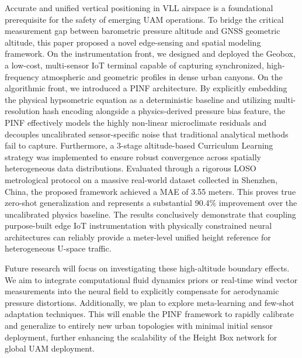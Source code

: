 \documentclass[lettersize,journal]{IEEEtran}
\begin{document}
Accurate and unified vertical positioning in VLL airspace is a foundational prerequisite for the safety of emerging UAM operations. To bridge the critical measurement gap between barometric pressure altitude and GNSS geometric altitude, this paper proposed a novel edge-sensing and spatial modeling framework.
On the instrumentation front, we designed and deployed the Geobox, a low-cost, multi-sensor IoT terminal capable of capturing synchronized, high-frequency atmospheric and geometric profiles in dense urban canyons. On the algorithmic front, we introduced a PINF architecture. By explicitly embedding the physical hypsometric equation as a deterministic baseline and utilizing multi-resolution hash encoding alongside a physics-derived pressure bias feature, the PINF effectively models the highly non-linear microclimate residuals and decouples uncalibrated sensor-specific noise that traditional analytical methods fail to capture. Furthermore, a 3-stage altitude-based Curriculum Learning strategy was implemented to ensure robust convergence across spatially heterogeneous data distributions. Evaluated through a rigorous LOSO metrological protocol on a massive real-world dataset collected in Shenzhen, China, the proposed framework achieved a MAE of 3.55 meters. This proves true zero-shot generalization and represents a substantial 90.4\% improvement over the uncalibrated physics baseline. The results conclusively demonstrate that coupling purpose-built edge IoT instrumentation with physically constrained neural architectures can reliably provide a meter-level unified height reference for heterogeneous U-space traffic.

Future research will focus on investigating these high-altitude boundary effects. We aim to integrate computational fluid dynamics priors or real-time wind vector measurements into the neural field to explicitly compensate for aerodynamic pressure distortions. Additionally, we plan to explore meta-learning and few-shot adaptation techniques. This will enable the PINF framework to rapidly calibrate and generalize to entirely new urban topologies with minimal initial sensor deployment, further enhancing the scalability of the Height Box network for global UAM deployment.


\end{document}
